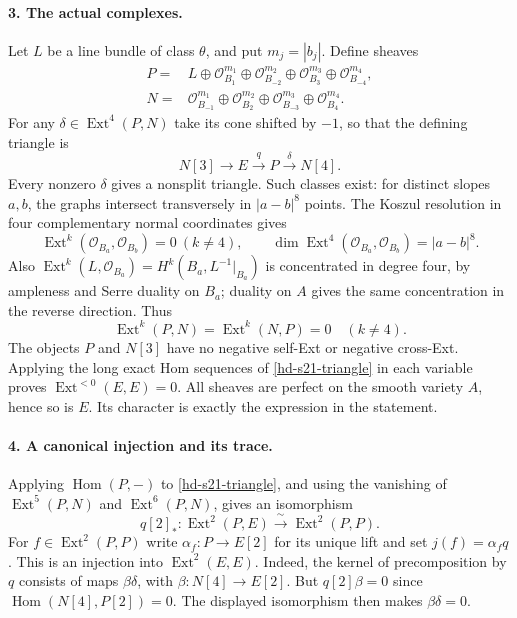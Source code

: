 \paragraph{3. The actual complexes.}
Let $L$ be a line bundle of class $\theta$, and put $m_j=|b_j|$.
Define sheaves
\begin{align*}
 P={}&L\oplus\mathcal O_{B_1}^{m_1}
       \oplus\mathcal O_{B_{-2}}^{m_2}
       \oplus\mathcal O_{B_3}^{m_3}
       \oplus\mathcal O_{B_{-4}}^{m_4},\\
 N={}&\mathcal O_{B_{-1}}^{m_1}
       \oplus\mathcal O_{B_2}^{m_2}
       \oplus\mathcal O_{B_{-3}}^{m_3}
       \oplus\mathcal O_{B_4}^{m_4}.
\end{align*}
For any $\delta\in\operatorname{Ext}^4(P,N)$ take its cone shifted
by $-1$, so that the defining triangle is
\begin{equation}\label{hd-s21-triangle}
 N[3]\longrightarrow E\xrightarrow{q}P
       \xrightarrow{\delta}N[4].
\end{equation}
Every nonzero $\delta$ gives a nonsplit triangle. Such classes exist:
for distinct slopes $a,b$, the graphs intersect transversely in
$|a-b|^8$ points. The Koszul resolution in four complementary normal
coordinates gives
\[
 \operatorname{Ext}^k(\mathcal O_{B_a},\mathcal O_{B_b})=0
 \ (k\ne4),\qquad
 \dim\operatorname{Ext}^4(\mathcal O_{B_a},\mathcal O_{B_b})
       =|a-b|^8.
\]
Also $\operatorname{Ext}^k(L,\mathcal O_{B_a})
=H^k(B_a,L^{-1}|_{B_a})$ is concentrated in degree four, by
ampleness and Serre duality on $B_a$; duality on $A$ gives the same
concentration in the reverse direction. Thus
\begin{equation}\label{hd-s21-cross}
 \operatorname{Ext}^k(P,N)=\operatorname{Ext}^k(N,P)=0
 \quad(k\ne4).
\end{equation}
The objects $P$ and $N[3]$ have no negative self-Ext or negative
cross-Ext. Applying the long exact Hom sequences of
\eqref{hd-s21-triangle} in each variable proves
$\operatorname{Ext}^{<0}(E,E)=0$.
All sheaves are perfect on the smooth variety $A$, hence so is $E$.
Its character is exactly the expression in the statement.

\paragraph{4. A canonical injection and its trace.}
Applying $\operatorname{Hom}(P,-)$ to
\eqref{hd-s21-triangle}, and using the vanishing of
$\operatorname{Ext}^5(P,N)$ and $\operatorname{Ext}^6(P,N)$,
gives an isomorphism
\[
 q[2]_*:\operatorname{Ext}^2(P,E)
          \xrightarrow{\ \sim\ }\operatorname{Ext}^2(P,P).
\]
For $f\in\operatorname{Ext}^2(P,P)$ write $\alpha_f:P\to E[2]$
for its unique lift and set $j(f)=\alpha_fq$.
This is an injection into $\operatorname{Ext}^2(E,E)$.
Indeed, the kernel of precomposition by $q$ consists of maps
$\beta\delta$, with $\beta:N[4]\to E[2]$. But
$q[2]\beta=0$ since $\operatorname{Hom}(N[4],P[2])=0$.
The displayed isomorphism then makes $\beta\delta=0$.

